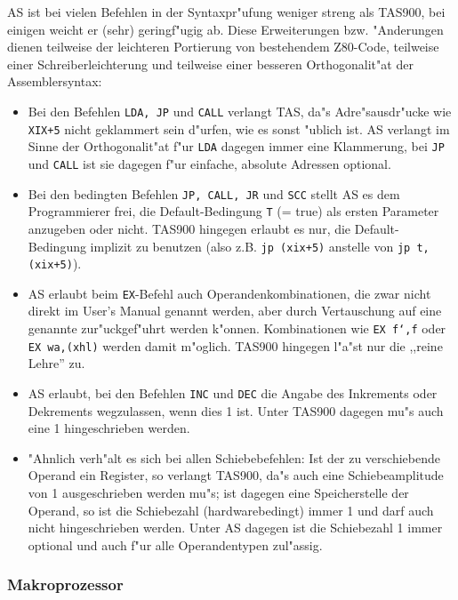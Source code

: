 \documentclass[12pt,a4paper,twoside]{report}
\newcommand{\tty}[1]{{\tt #1}}
\begin{document}
{AS ist bei vielen Befehlen in der Syntaxpr"ufung weniger streng als TAS900,
bei einigen weicht er (sehr) geringf"ugig ab.  Diese Erweiterungen bzw.
"Anderungen dienen teilweise der leichteren Portierung von bestehendem
Z80-Code, teilweise einer Schreiberleichterung und teilweise einer besseren
Orthogonalit"at der Assemblersyntax:
\begin{itemize}
\item{Bei den Befehlen \tty{LDA, JP} und \tty{CALL} verlangt TAS, da"s
      Adre"sausdr"ucke wie \tty{XIX+5} nicht geklammert sein d"urfen, wie
      es sonst "ublich ist.  AS verlangt im Sinne der Orthogonalit"at f"ur
      \tty{LDA} dagegen immer eine Klammerung, bei \tty{JP} und \tty{CALL}
      ist sie dagegen f"ur einfache, absolute Adressen optional.}
\item{Bei den bedingten Befehlen \tty{JP, CALL, JR} und \tty{SCC} stellt
      AS es dem Programmierer frei, die Default-Bedingung \tty{T} (= true) als
      ersten Parameter anzugeben oder nicht.  TAS900 hingegen erlaubt es
      nur, die Default-Bedingung implizit zu benutzen (also z.B.
      \tty{jp (xix+5)} anstelle von \tty{jp t,(xix+5)}).}
\item{AS erlaubt beim \tty{EX}-Befehl auch Operandenkombinationen, die
      zwar nicht direkt im User's Manual\cite{Tosh900} genannt werden,
      aber durch Vertauschung auf eine genannte zur"uckgef"uhrt werden
      k"onnen.  Kombinationen wie \tty{EX f`,f} oder \tty{EX wa,(xhl)}
      werden damit m"oglich.  TAS900 hingegen l"a"st nur die ,,reine Lehre''
      zu.}
\item{AS erlaubt, bei den Befehlen \tty{INC} und \tty{DEC} die Angabe
      des Inkrements oder Dekrements wegzulassen, wenn dies 1 ist.  Unter
      TAS900 dagegen mu"s auch eine 1 hingeschrieben werden.}
\item{"Ahnlich verh"alt es sich bei allen Schiebebefehlen: Ist der zu
      verschiebende Operand ein Register, so verlangt TAS900, da"s auch
      eine Schiebeamplitude von 1 ausgeschrieben werden mu"s; ist dagegen
      eine Speicherstelle der Operand, so ist die Schiebezahl
      (hardwarebedingt) immer 1 und darf auch nicht hingeschrieben werden.
      Unter AS dagegen ist die Schiebezahl 1 immer optional und auch f"ur
      alle Operandentypen zul"assig.}
\end{itemize}

\subsubsection{Makroprozessor}

}
\end{document}
